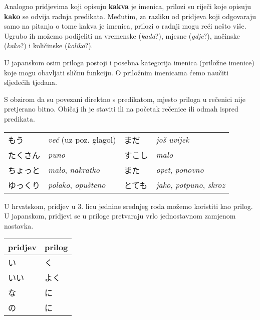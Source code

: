 
\author{Tomislav Mamić}

	
	Analogno pridjevima koji opisuju \textbf{kakva} je imenica, prilozi su riječi koje opisuju \textbf{kako} se odvija radnja predikata. Međutim, za razliku od pridjeva koji odgovaraju samo na pitanja o tome kakva je imenica, prilozi o radnji mogu reći nešto više. Ugrubo ih možemo podijeliti na vremenske (\textit{kada}?), mjesne (\textit{gdje}?), načinske (\textit{kako}?) i količinske (\textit{koliko}?).
	
	U japanskom osim priloga postoji i posebna kategorija imenica (priložne imenice) koje mogu obavljati sličnu funkciju. O priložnim imenicama ćemo naučiti sljedećih tjedana.
	
	
	S obzirom da su povezani direktno s predikatom, mjesto priloga u rečenici nije pretjerano bitno. Običaj ih je staviti ili na početak rečenice ili odmah ispred predikata.
	
	\vspace{10pt}
	\begin{tabular}{l l l l}
		もう&\textit{već} (uz poz. glagol)&まだ&\textit{još uvijek}\\
		たくさん&\textit{puno}&すこし&\textit{malo}\\
		ちょっと&\textit{malo}, \textit{nakratko}&また&\textit{opet}, \textit{ponovno}\\
		ゆっくり&\textit{polako}, \textit{opušteno}&とても&\textit{jako}, \textit{potpuno}, \textit{skroz}\\
	\end{tabular}

	
	U hrvatskom, pridjev u 3. licu jednine srednjeg roda možemo koristiti kao prilog. U japanskom, pridjevi se u priloge pretvaraju vrlo jednostavnom zamjenom nastavka.
	
	\begin{table}[h]
		\centering
		\begin{tabular}{l l}\toprule[2pt]
			pridjev&prilog\\
			\midrule
			い&く\\
			いい\footnotemark[1]&よく\\
			な&に\\
			の&に\\
			\bottomrule[2pt]
		\end{tabular}
	\end{table}

